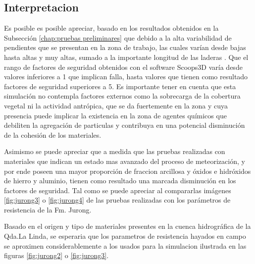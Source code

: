 \subsection{Interpretacion}
Es posible es posible apreciar, basado en los resultados obtenidos en la Subsecci\'on \ref{chap:pruebas preliminares} que debido a la alta variabilidad de pendientes que se presentan en la zona de trabajo, las cuales var\'ian desde bajas hasta altas y muy altas, sumado a la importante longitud de las laderas . Que el rango de factores de seguridad obtenidos con el software Scoops3D var\'ia desde valores inferiores a 1 que implican falla, hasta valores que tienen como resultado factores de seguridad superiores a 5.
Es importante tener en cuenta que esta simulaci\'on no contempla factores externos como la sobrecarga de la cobertura vegetal ni la actividad antr\'opica, que se da fuertemente en la zona y cuya presencia puede implicar la existencia en la zona de agentes qu\'imicos que debiliten la agregaci\'on de particulas y contribuya en una potencial disminuci\'on de la cohesi\'on de los materiales.

Asimismo se puede apreciar que a medida que las pruebas realizadas con materiales que indican un estado mas avanzado del proceso de meteorizaci\'on, y por ende poseen una mayor proporci\'on de fraccion arcillosa y \'oxidos e hidr\'oxidos de hierro y aluminio, tienen como resultado una marcada disminuci\'on en los factores de seguridad. Tal como se puede apreciar al compararlas im\'agenes \ref{fig:jurong3} o \ref{fig:jurong4} de las pruebas realizadas con los par\'ametros de resistencia de la Fm. Jurong.

Basado en el origen y tipo de materiales presentes en la cuenca hidrogr\'afica de la Qda.La Linda, se esperaria que los parametros de resistencia hayados en campo se aproximen considerablemente a los usados para la simulacion ilustrada en las figuras \ref{fig:jurong2} o \ref{fig:jurong3}.  

